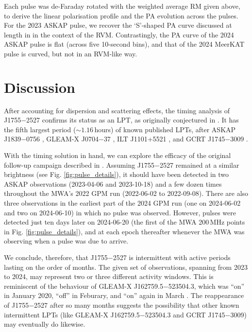 \documentclass[preprint2,linenumbers]{aastex631}
\newcommand{\src}{J1755$-$2527}
\begin{document}
Each pulse was de-Faraday rotated with the weighted average RM given above, to derive the linear polarisation profile and the PA evolution across the pulses.
For the 2023 ASKAP pulse, we recover the `S'-shaped PA curve discussed at length in  in the context of the RVM.
Contrastingly, the PA curve of the 2024 ASKAP pulse is flat (across five 10-second bins), and that of the 2024 MeerKAT pulse is curved, but not in an RVM-like way.

\section{Discussion} \label{sec:discussion}

After accounting for dispersion and scattering effects, the timing analysis of \src{} confirms its status as an LPT, as originally conjectured in .
It has the fifth largest period (${\sim}1.16\,$hours) of known published LPTs, after ASKAP J1839$-$0756 \citep[$6.45\,$hours;][]{Lee2025}, GLEAM-X J0704$-$37 \citep[$2.92\,$hours;][]{2024arXiv240815757H, 2025arXiv250103315R}, ILT J1101+5521 \citep[$2.09\,$hours;][]{deRuiter2025}, and GCRT J1745$-$3009 \citep[$1.28\,$hours;][]{2005Natur.434...50H}.

With the timing solution in hand, we can explore the efficacy of the original follow-up campaign described in .
Assuming \src{} remained at a similar brightness (see Fig. \ref{fig:pulse_details}), it should have been detected in two ASKAP observations (2023-04-06 and 2023-10-18) and a few dozen times throughout the MWA's 2022 GPM run (2022-06-02 to 2022-09-08).
There are also three observations in the earliest part of the 2024 GPM run (one on 2024-06-02 and two on 2024-06-10) in which no pulse was observed.
However, pulses were detected just ten days later on 2024-06-20 (the first of the MWA 200\,MHz points in Fig. \ref{fig:pulse_details}), and at each epoch thereafter whenever the MWA was observing when a pulse was due to arrive.

We conclude, therefore, that \src{} is intermittent with active periods lasting on the order of months.
The given set of observations, spanning from 2023 to 2024, may represent two or three different activity windows.
This is reminiscent of the behaviour of GLEAM-X J162759.5$-$523504.3, which was ``on'' in January 2020, ``off'' in Feburary, and ``on'' again in March \citep{2022Natur.601..526H}.
The reappearance of \src{} after so many months suggests the possibility that other known intermittent LPTs (like GLEAM-X J162759.5$-$523504.3 and GCRT J1745$-$3009) may eventually do likewise.
\end{document}
